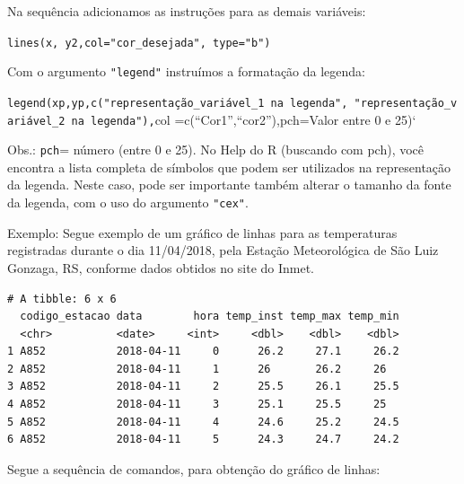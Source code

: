 \documentclass[12pt,brazil,oneside]{book}
\newenvironment{Shaded}{\begin{snugshade}}{\end{snugshade}}
\newcommand{\DataTypeTok}[1]{\textcolor[rgb]{0.13,0.29,0.53}{#1}}
\newcommand{\KeywordTok}[1]{\textcolor[rgb]{0.13,0.29,0.53}{\textbf{#1}}}
\newcommand{\NormalTok}[1]{#1}
\newcommand{\OtherTok}[1]{\textcolor[rgb]{0.56,0.35,0.01}{#1}}
\newcommand{\StringTok}[1]{\textcolor[rgb]{0.31,0.60,0.02}{#1}}
\begin{document}
Na sequência adicionamos as instruções para as demais variáveis:

\texttt{lines(x,\ y2,col="cor\_desejada",\ type="b")}

Com o argumento \texttt{"legend"} instruímos a formatação da legenda:

\texttt{legend(xp,yp,c("representação\_variável\_1\ na\ legenda",\ "representação\_variável\_2\ na\ legenda"),}col
=c(``Cor1'',``cor2''),pch=Valor entre 0 e 25)`

Obs.: \texttt{pch}= número (entre 0 e 25). No Help do R (buscando com
pch), você encontra a lista completa de símbolos que podem ser
utilizados na representação da legenda. Neste caso, pode ser importante
também alterar o tamanho da fonte da legenda, com o uso do argumento
\texttt{"cex"}.

Exemplo: Segue exemplo de um gráfico de linhas para as temperaturas
registradas durante o dia 11/04/2018, pela Estação Meteorológica de São
Luiz Gonzaga, RS, conforme dados obtidos no site do Inmet.

\begin{Shaded}
\end{Shaded}

\begin{verbatim}
# A tibble: 6 x 6
  codigo_estacao data        hora temp_inst temp_max temp_min
  <chr>          <date>     <int>     <dbl>    <dbl>    <dbl>
1 A852           2018-04-11     0      26.2     27.1     26.2
2 A852           2018-04-11     1      26       26.2     26  
3 A852           2018-04-11     2      25.5     26.1     25.5
4 A852           2018-04-11     3      25.1     25.5     25  
5 A852           2018-04-11     4      24.6     25.2     24.5
6 A852           2018-04-11     5      24.3     24.7     24.2
\end{verbatim}

Segue a sequência de comandos, para obtenção do gráfico de linhas:
\end{document}
